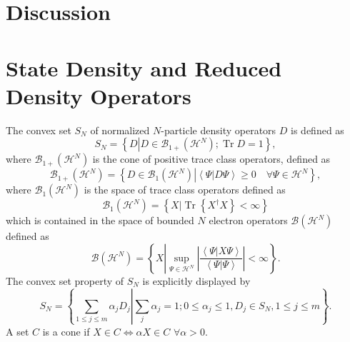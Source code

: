 \documentclass[aps,preprint]{revtex4}%
\begin{document}
\section{Discussion\label{Discussion}}

\appendix


\section{State Density and Reduced Density Operators \label{Denmat}}

The convex set $S_{N}$ of normalized $N$-particle density operators $D$ is
defined as
\begin{equation}
S_{N}=\left\{  D\left\vert D\in\mathcal{B}_{1+}\left(  \mathcal{H}^{N}\right)
;\operatorname{Tr}D=1\right.  \right\}  ,
\end{equation}
where $\mathcal{B}_{1+}\left(  \mathcal{H}^{N}\right)  $ is the cone of
positive trace class operators, defined as
\begin{equation}
\mathcal{B}_{1+}\left(  \mathcal{H}^{N}\right)  =\left\{  D\in\mathcal{B}%
_{1}\left(  \mathcal{H}^{N}\right)  \left\vert \overset{}{\left\langle
\Psi\left\vert D\Psi\right.  \right\rangle }\geq0\quad\forall\Psi
\in\mathcal{H}^{N}\right.  \right\}  ,
\end{equation}
where $\mathcal{B}_{1}\left(  \mathcal{H}^{N}\right)  $ is the space of trace
class operators defined as
\begin{equation}
\mathcal{B}_{1}\left(  \mathcal{H}^{N}\right)  =\left\{  \left.  X\right\vert
\operatorname{Tr}\left\{  X^{\dagger}X\right\}  <\infty\right\}
\end{equation}
which is contained in the space of bounded $N$ electron operators
$\mathcal{B}\left(  \mathcal{H}^{N}\right)  $ defined as
\begin{equation}
\mathcal{B}\left(  \mathcal{H}^{N}\right)  =\left\{  X\left\vert \sup_{\Psi
\in\mathcal{H}^{N}}\left\vert \frac{\left\langle \Psi\left\vert X\Psi\right.
\right\rangle }{\left\langle \Psi\left\vert \Psi\right.  \right\rangle
}\right\vert <\infty\right.  \right\}  .
\end{equation}
The convex set property of $S_{N}$ is explicitly displayed by
\begin{equation}
S_{N}=\left\{  \left.  \sum_{1\leq j\leq m}\alpha_{j}D_{j}\right\vert \sum
_{j}\alpha_{j}=1;0\leq\alpha_{j}\leq1,D_{j}\in S_{N},1\leq j\leq m\right\}  .
\end{equation}
A set $C$ is a cone if $X\in C\Leftrightarrow\alpha X\in C$ $\forall\alpha>0.$
\end{document}

